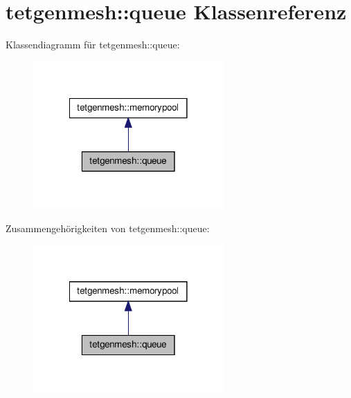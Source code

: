\hypertarget{classtetgenmesh_1_1queue}{\section{tetgenmesh\-:\-:queue Klassenreferenz}
\label{classtetgenmesh_1_1queue}
}


Klassendiagramm für tetgenmesh\-:\-:queue\-:\nopagebreak
\begin{figure}[H]
\begin{center}
\leavevmode
\includegraphics[width=206pt]{classtetgenmesh_1_1queue__inherit__graph}
\end{center}
\end{figure}


Zusammengehörigkeiten von tetgenmesh\-:\-:queue\-:\nopagebreak
\begin{figure}[H]
\begin{center}
\leavevmode
\includegraphics[width=206pt]{classtetgenmesh_1_1queue__coll__graph}
\end{center}
\end{figure}
